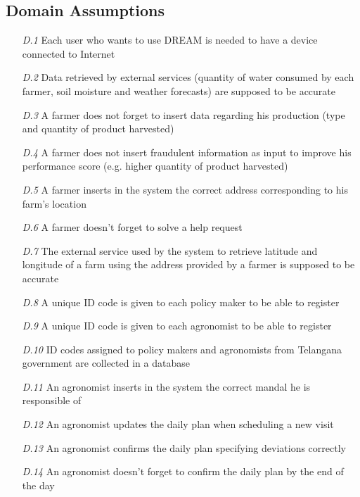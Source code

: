 \subsection{Domain Assumptions}

\begin{itemize}
    \item [\textit{D.1}] Each user who wants to use DREAM is needed to have a device connected to Internet 
    \item [\textit{D.2}] Data retrieved by external services (quantity of water consumed by each farmer, soil moisture and weather forecasts) are supposed to be accurate 
    \item [\textit{D.3}] A farmer does not forget to insert data regarding his production (type and quantity of product harvested)
    \item [\textit{D.4}] A farmer does not insert fraudulent information as input to  improve his performance score (e.g. higher quantity of product harvested)
    \item [\textit{D.5}] A farmer inserts in the system the correct address
    corresponding to his farm's location
    \item [\textit{D.6}] A farmer doesn't forget to solve a help request
    \item [\textit{D.7}]The external service used by the system to retrieve latitude and longitude of a farm using the address provided by a farmer is supposed to be accurate
    \item [\textit{D.8}] A unique ID code is given to each policy maker to be able to register
    \item [\textit{D.9}] A unique ID code is given to each agronomist to be able to register
    \item [\textit{D.10}] ID codes assigned to policy makers and agronomists from Telangana government are collected in a database
    \item [\textit{D.11}] An agronomist inserts in the system the correct mandal he is responsible of
    \item [\textit{D.12}] An agronomist updates the daily plan when scheduling a new visit
    \item [\textit{D.13}] An agronomist confirms the daily plan specifying deviations correctly 
    \item [\textit{D.14}] An agronomist doesn't forget to confirm the daily plan by the end of the day
\end{itemize}

